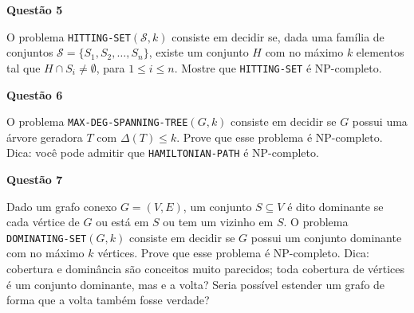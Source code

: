 \documentclass[]{article}
\begin{document}
\vspace{\baselineskip}

\textbf{Questão 5}

O problema \texttt{HITTING-SET}$(\mathcal{S}, k)$ consiste em decidir
se, dada uma família de conjuntos
$\mathcal{S} = \{S_1, S_2, \dots, S_n\}$, existe um conjunto $H$ com
no máximo $k$ elementos tal que $H \cap S_i \neq \emptyset$, para
$1 \leq i \leq n$.  Mostre que \texttt{HITTING-SET} é NP-completo.

\vspace{\baselineskip}

\textbf{Questão 6}

O problema \texttt{MAX-DEG-SPANNING-TREE}$(G, k)$ consiste em decidir
se $G$ possui uma árvore geradora $T$ com $\Delta(T) \leq k$.  Prove
que esse problema é NP-completo.  Dica: você pode admitir que
\texttt{HAMILTONIAN-PATH} é NP-completo.

\vspace{\baselineskip}

\textbf{Questão 7}

Dado um grafo conexo $G = (V, E)$, um conjunto $S \subseteq V$ é dito
dominante se cada vértice de $G$ ou está em $S$ ou tem um vizinho em
$S$.  O problema \texttt{DOMINATING-SET}$(G, k)$ consiste em decidir
se $G$ possui um conjunto dominante com no máximo $k$ vértices.  Prove
que esse problema é NP-completo.  Dica: cobertura e dominância são
conceitos muito parecidos; toda cobertura de vértices é um conjunto
dominante, mas e a volta? Seria possível estender um grafo de forma
que a volta também fosse verdade?
\end{document}
